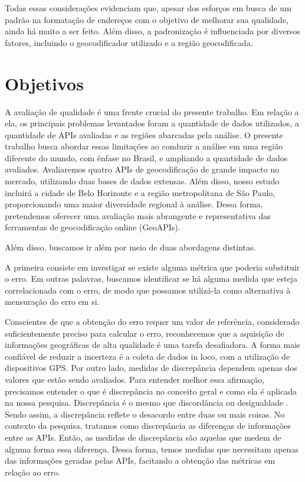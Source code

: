 Todas essas considerações evidenciam que, apesar dos esforços em busca de um padrão na formatação de endereços com o objetivo de melhorar sua qualidade, ainda há muito a ser feito. Além disso, a padronização é influenciada por diversos fatores, incluindo o geocodificador utilizado e a região geocodificada. 

\section{Objetivos}

A avaliação de qualidade é uma frente crucial do presente trabalho. Em relação a ela, os principais problemas levantados foram a quantidade de dados utilizados, a quantidade de APIs avaliadas e as regiões abarcadas pela análise. O presente trabalho busca abordar essas limitações ao conduzir a análise em uma região diferente do mundo, com ênfase no Brasil, e ampliando a quantidade de dados avaliados. Avaliaremos quatro APIs de geocodificação de grande impacto no mercado, utilizando duas bases de dados extensas. Além disso, nosso estudo incluirá a cidade de Belo Horizonte e a região metropolitana de São Paulo, proporcionando uma maior diversidade regional à análise. Dessa forma, pretendemos oferecer uma avaliação mais abrangente e representativa das ferramentas de geocodificação online (GeoAPIs).

Além disso, buscamos ir além por meio de duas abordagens distintas.

A primeira consiste em investigar se existe alguma métrica que poderia substituir o erro. Em outras palavras, buscamos identificar se há alguma medida que esteja correlacionada com o erro, de modo que possamos utilizá-la como alternativa à mensuração do erro em si.

Conscientes de que a obtenção do erro requer um valor de referência, considerado suficientemente preciso para calcular o erro, reconhecemos que a aquisição de informações geográficas de alta qualidade é uma tarefa desafiadora. A forma mais confiável de reduzir a incerteza é a coleta de dados in loco, com a utilização de dispositivos GPS.
Por outro lado, medidas de discrepância dependem apenas dos valores que estão sendo avaliados. Para entender melhor essa afirmação, precisamos entender o que é discrepância no conceito geral e como ela é aplicada na nossa pesquisa. Discrepância é o mesmo que discordância ou desigualdade \cite{klein2015}. Sendo assim, a discrepância reflete o desacordo entre duas ou mais coisas. No contexto da pesquisa, tratamos como discrepância as diferenças de informações entre as APIs. Então, as medidas de discrepância são aquelas que medem de alguma forma essa diferença. Dessa forma, temos medidas que necessitam apenas das informações geradas pelas APIs, facitando a obtenção das métricas em relação ao erro.

